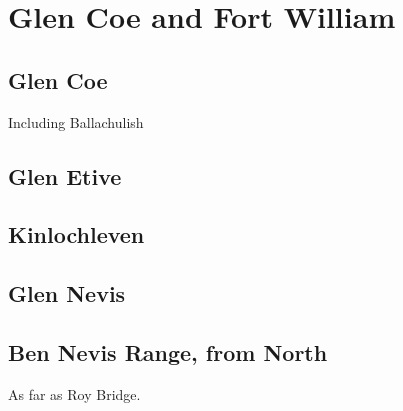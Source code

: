 
\section{Glen Coe and Fort William}

\subsection{Glen Coe}

Including Ballachulish

\subsection{Glen Etive}

\subsection{Kinlochleven}

\subsection{Glen Nevis}

\subsection{Ben Nevis Range, from North}

As far as Roy Bridge. 
